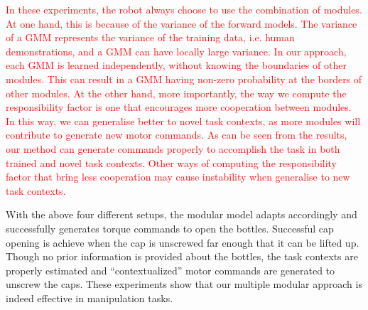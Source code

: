 \textcolor{red}{In these experiments, the robot always choose to use the combination of modules. At one hand, this is because of the variance of the forward models. The variance of a GMM represents the variance of the training data, i.e. human demonstrations, and a GMM can have locally large variance.
In our approach, each GMM is learned independently, without knowing the boundaries of other modules. This can result in a GMM having non-zero probability at the borders of other modules. At the other hand, more importantly, the way we compute the responsibility factor is one that encourages more cooperation between modules. In this way, we can generalise better to novel task contexts, as more modules will contribute to generate new motor commands. As can be seen from the results, our method can generate commands properly to accomplish the task in both trained and novel task contexts. Other ways of computing the responsibility factor that bring less cooperation may cause instability when generalise to new task contexts. }


With the above four different setups, the modular model adapts
accordingly and successfully generates torque commands to open the
bottles. Successful cap opening is achieve when the cap is unscrewed
far enough that it can be lifted up. Though no prior information is
provided about the bottles, the task contexts are properly estimated
and ``contextualized'' motor commands are generated to unscrew the
caps. These experiments show that our multiple modular approach is
indeed effective in manipulation tasks.



